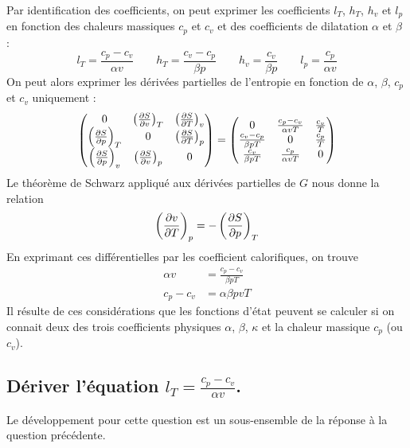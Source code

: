 Par identification des coefficients, on peut exprimer les coefficients $l_T$, $h_T$, $h_v$ et $l_p$ en fonction des chaleurs massiques $c_p$ et $c_v$ et des coefficients de dilatation $\alpha$ et $\beta$ :
\[
	l_T = \frac{c_p-c_v}{\alpha v} \qquad
	h_T = \frac{c_v-c_p}{\beta p} \qquad
	h_v = \frac{c_v}{\beta p} \qquad
	l_p = \frac{c_p}{\alpha v}
\]
On peut alors exprimer les dérivées partielles de l'entropie en fonction de $\alpha$, $\beta$, $c_p$ et $c_v$ uniquement :
\[
	\begin{pmatrix}
		0						& \left(\pdv{S}{v}\right)_{T}	& \left(\pdv{S}{T}\right)_{v}	\\
		\left(\pdv{S}{p}\right)_{T}	& 0						& \left(\pdv{S}{T}\right)_{p}	\\
		\left(\pdv{S}{p}\right)_{v}	& \left(\pdv{S}{v}\right)_{p}	& 0
	\end{pmatrix}
	=
	\begin{pmatrix}
		0							& \frac{c_p-c_v}{\alpha v T}	& \frac{c_v}{T}	\\
		\frac{c_v-c_p}{\beta p T}	& 0								& \frac{c_p}{T}	\\
		\frac{c_v}{\beta p T}		& \frac{c_p}{\alpha v T}		& 0
	\end{pmatrix}
\]
Le théorème de Schwarz appliqué aux dérivées partielles de $G$ nous donne la relation
\[ \left(\pdv{v}{T}\right)_{p} = - \left(\pdv{S}{p}\right)_{T} \]
En exprimant ces différentielles par les coefficient calorifiques, on trouve
\begin{align*}
	\alpha v &= \frac{c_p - c_v}{\beta p T} \\
	c_p - c_v &= \alpha \beta p v T
\end{align*}
Il résulte de ces considérations que les fonctions d'état peuvent se calculer si on connait deux des trois coefficients physiques $\alpha$, $\beta$, $\kappa$ et la chaleur massique $c_p$ (ou $c_v$).

\subsection{Dériver l'équation $l_T = \frac{c_p-c_v}{\alpha v}$.}
Le développement pour cette question est un sous-ensemble de la réponse à la question précédente.

